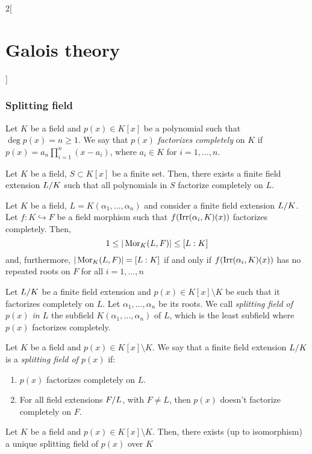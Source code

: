 \documentclass[../../../main.tex]{subfiles}
\begin{document}
\begin{multicols}{2}[\section{Galois theory}]
  \subsubsection*{Splitting field}
  \begin{definition}
    Let $K$ be a field and $p(x)\in K[x]$ be a polynomial such that $\deg p(x)=n\geq 1$. We say that $p(x)$ \textit{factorizes completely} on $K$ if $p(x)=a_n\prod_{i=1}^n(x-a_i)$, where $a_i\in K$ for $i=1,\ldots,n$.
  \end{definition}
  \begin{theorem}
    Let $K$ be a field, $S\subset K[x]$ be a finite set. Then, there exists a finite field extension $\quot{L}{K}$ such that all polynomials in $S$ factorize completely on $L$.
  \end{theorem}
  \begin{theorem}
    Let $K$ be a field, $L=K(\alpha_1,\ldots,\alpha_n)$ and consider a finite field extension $\quot{L}{K}$. Let $f:K\hookrightarrow F$ be a field morphism such that $f(\operatorname{Irr}(\alpha_i,K)(x))$ factorizes completely. Then, $$1\leq|\operatorname{Mor}_K(L,F)|\leq [L:K]$$ and, furthermore, $|\operatorname{Mor}_K(L,F)|=[L:K]$ if and only if $f(\operatorname{Irr}(\alpha_i,K)(x))$ has no repeated roots on $F$ for all $i=1,\ldots,n$
  \end{theorem}
  \begin{definition}
    Let $\quot{L}{K}$ be a finite field extension and $p(x)\in K[x]\setminus K$ be such that it factorizes completely on $L$. Let $\alpha_1,\ldots,\alpha_n$ be its roots. We call \textit{splitting field of $p(x)$ in $L$} the subfield $K(\alpha_1,\ldots,\alpha_n)$ of $L$, which is the least subfield where $p(x)$ factorizes completely.
  \end{definition}
  \begin{definition}
    Let $K$ be a field and $p(x)\in K[x]\setminus K$. We say that a finite field extension $\quot{L}{K}$ is a \textit{splitting field of $p(x)$} if:
    \begin{enumerate}
      \item $p(x)$ factorizes completely on $L$.
      \item For all field extensions $\quot{F}{L}$, with $F\ne L$, then $p(x)$ doesn't factorize completely on $F$.
    \end{enumerate}
  \end{definition}
  \begin{theorem}
    Let $K$ be a field and $p(x)\in K[x]\setminus K$. Then, there exists (up to isomorphism) a unique splitting field of $p(x)$ over $K$

\end{theorem}
\end{multicols}
\end{document}
